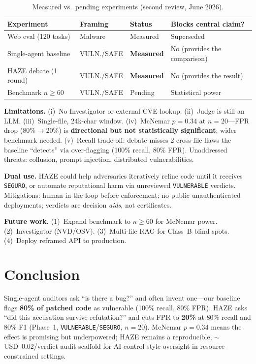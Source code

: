 \documentclass[10pt]{article}
\begin{document}
\begin{table}[ht]
\centering
\small
\caption{Measured vs.\ pending experiments (second review, June 2026).}
\label{tab:validation}
\begin{tabularx}{\textwidth}{@{}L{3.2cm} L{2.4cm} L{2.2cm} X@{}}
\toprule
Experiment & Framing & Status & Blocks central claim? \\
\midrule
Web eval (120 tasks) & Malware & Measured & Superseded \\
Single-agent baseline & VULN./SAFE & \textbf{Measured} & No (provides the comparison) \\
HAZE debate (1 round) & VULN./SAFE & \textbf{Measured} & No (provides the result) \\
Benchmark $n{\geq}60$ & VULN./SAFE & Pending & Statistical power \\
\bottomrule
\end{tabularx}
\end{table}

\textbf{Limitations.} (i)~No Investigator or external CVE lookup. (ii)~Judge is still an
LLM. (iii)~Single-file, 24k-char window. (iv)~McNemar $p{=}0.34$ at $n{=}20$---FPR drop
(80\%$\rightarrow$20\%) is \textbf{directional but not statistically significant}; wider
benchmark needed. (v)~Recall trade-off: debate misses 2 cross-file flaws the baseline
``detects'' via over-flagging (100\% recall, 80\% FPR). Unaddressed threats: collusion,
prompt injection, distributed vulnerabilities.

\textbf{Dual use.} HAZE could help adversaries iteratively refine code until it receives
\texttt{SEGURO}, or automate reputational harm via unreviewed \texttt{VULNERABLE} verdicts.
Mitigations: human-in-the-loop before enforcement; no public unauthenticated deployments;
verdicts are decision \textit{aids}, not certificates.

\textbf{Future work.} (1)~Expand benchmark to $n{\geq}60$ for McNemar power.
(2)~Investigator (NVD/OSV). (3)~Multi-file RAG for Class~B blind spots.
(4)~Deploy reframed API to production.

\section{Conclusion}

Single-agent auditors ask ``is there a bug?'' and often invent one---our baseline flags
\textbf{80\% of patched code} as vulnerable (100\% recall, 80\% FPR). HAZE asks ``did this
accusation survive refutation?'' and cuts FPR to \textbf{20\%} at 80\% recall and 80\% F1
(Phase~1, \texttt{VULNERABLE}/\texttt{SEGURO}, $n{=}20$). McNemar $p{=}0.34$ means the
effect is promising but underpowered; HAZE remains a reproducible, ${\sim}$USD~0.02/verdict
audit scaffold for AI-control-style oversight in resource-constrained settings.
\end{document}
